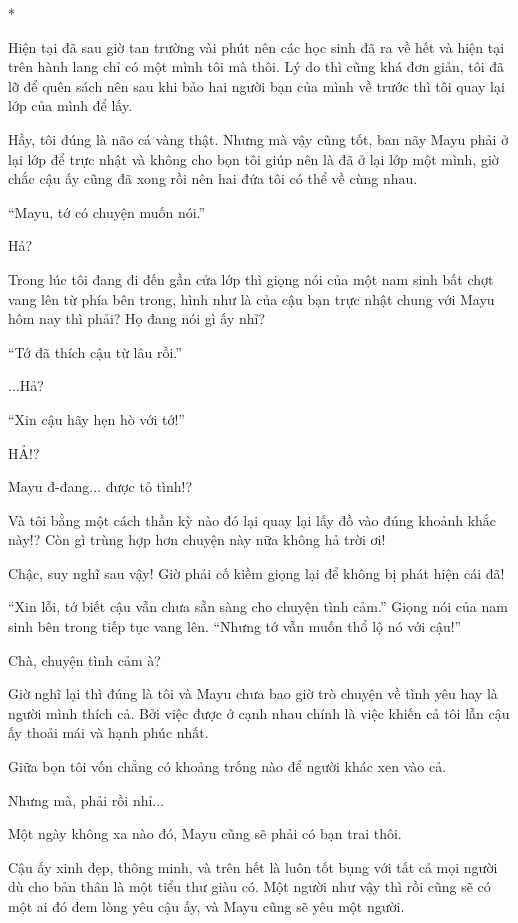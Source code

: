 {    *

    Hiện tại đã sau giờ tan trường vài phút nên các học sinh đã ra về hết và
    hiện tại trên hành lang chỉ có một mình tôi mà thôi. Lý do thì cũng khá
    đơn giản, tôi đã lỡ để quên sách nên sau khi bảo hai người bạn của mình
    về trước thì tôi quay lại lớp của mình để lấy.

    Hầy, tôi đúng là não cá vàng thật. Nhưng mà vậy cũng tốt, ban nãy Mayu
    phải ở lại lớp để trực nhật và không cho bọn tôi giúp nên là đã ở lại
    lớp một mình, giờ chắc cậu ấy cũng đã xong rồi nên hai đứa tôi có thể về
    cùng nhau.

    ``Mayu, tớ có chuyện muốn nói.''

    Hả?

    Trong lúc tôi đang đi đến gần cửa lớp thì giọng nói của một nam sinh bất
    chợt vang lên từ phía bên trong, hình như là của cậu bạn trực nhật chung
    với Mayu hôm nay thì phải? Họ đang nói gì ấy nhỉ?

    ``Tớ đã thích cậu từ lâu rồi.''

    ...Hả?

    ``Xin cậu hãy hẹn hò với tớ!''

    HẢ!?

    Mayu đ-đang... được tỏ tình!?

    Và tôi bằng một cách thần kỳ nào đó lại quay lại lấy đồ vào đúng khoảnh
    khắc này!? Còn gì trùng hợp hơn chuyện này nữa không hả trời ơi!

    Chậc, suy nghĩ sau vậy! Giờ phải cố kiềm giọng lại để không bị phát hiện
    cái đã!

    ``Xin lỗi, tớ biết cậu vẫn chưa sẵn sàng cho chuyện tình cảm.'' Giọng
    nói của nam sinh bên trong tiếp tục vang lên. ``Nhưng tớ vẫn muốn thổ lộ
    nó với cậu!''

    Chà, chuyện tình cảm à?

    Giờ nghĩ lại thì đúng là tôi và Mayu chưa bao giờ trò chuyện về tình yêu
    hay là người mình thích cả. Bởi việc được ở cạnh nhau chính là việc
    khiến cả tôi lẫn cậu ấy thoải mái và hạnh phúc nhất.

    Giữa bọn tôi vốn chẳng có khoảng trống nào để người khác xen vào cả.

    Nhưng mà, phải rồi nhỉ...

    Một ngày không xa nào đó, Mayu cũng sẽ phải có bạn trai thôi.

    Cậu ấy xinh đẹp, thông minh, và trên hết là luôn tốt bụng với tất cả mọi
    người dù cho bản thân là một tiểu thư giàu có. Một người như vậy thì rồi
    cũng sẽ có một ai đó đem lòng yêu cậu ấy, và Mayu cũng sẽ yêu một người.

}
